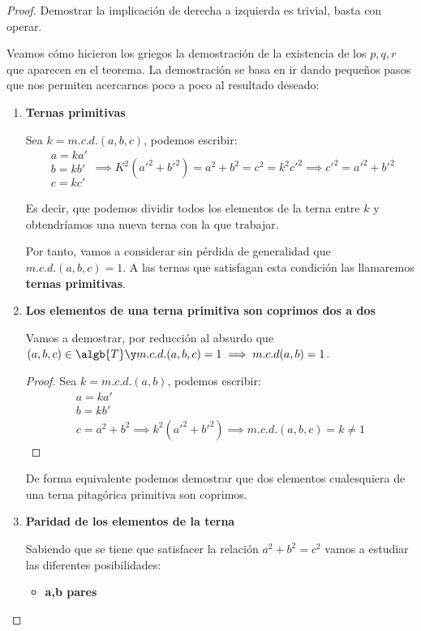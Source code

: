 \documentclass{apuntes}
\begin{document}
\begin{proof}
Demostrar la implicación de derecha a izquierda es trivial, basta con operar.

Veamos cómo hicieron los griegos la demostración de la existencia de los $p,q,r$ que aparecen en el teorema. La demostración se basa en ir dando pequeños pasos que nos permiten acercarnos poco a poco al resultado deseado:

\begin{enumerate}
\item \textbf{Ternas primitivas}

Sea $k=m.c.d.(a,b,c)$, podemos escribir:
\[\begin{array}{l} a=ka' \\ b=kb' \\ c=kc' \end{array}  \implies K^2(a'^2+b'^2)=a^2+b^2 = c^2=k^2c'^2 \implies c'^2=a'^2+b'^2\]

Es decir, que podemos dividir todos los elementos de la terna entre $k$ y obtendríamos una nueva terna con la que trabajar. 

Por tanto, vamos a considerar sin pérdida de generalidad que $m.c.d.(a,b,c) = 1$. A las ternas que satisfagan esta condición las llamaremos \textbf{ternas primitivas}.

\item \textbf{Los elementos de una terna primitiva son coprimos dos a dos}

Vamos a demostrar, por reducción al absurdo que $(a,b,c) \in \algb{T} \y m.c.d.(a,b,c)=1 \implies m.c.d(a,b)=1$.
\begin{proof}
Sea $k=m.c.d.(a,b)$, podemos escribir:
\[\begin{array}{l} a=ka' \\ b=kb' \\ c=a^2+b^2 \implies k^2(a'^2+b'^2) \implies m.c.d.(a,b,c)=k \neq 1 \end{array}\]
\end{proof}

De forma equivalente podemos demostrar que dos elementos cualesquiera de una terna pitagórica primitiva son coprimos.

\item \textbf{Paridad de los elementos de la terna}

Sabiendo que se tiene que satisfacer la relación $a^2+b^2=c^2$ vamos a estudiar las diferentes posibilidades:

\begin{itemize}
\item \textbf{a,b pares}


\end{itemize}
\end{enumerate}
\end{proof}
\end{document}

